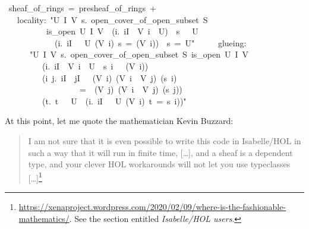 \documentclass[12pt]{scrartcl}
\begin{document}
\begin{isabelle}
\ sheaf\_of\_rings\ =\ presheaf\_of\_rings\ +\isanewline
\ \ \ locality:\ "\isasymAnd U\ I\ V\ s.\ open\_cover\_of\_open\_subset\ S\ \isanewline
\ \ \ \ \ \ \ \ \ \ is\_open\ U\ I\ V\ \isasymLongrightarrow \ (\isasymAnd i.\ i\isasymin I\ \isasymLongrightarrow \ V\ i\ \isasymsubseteq \ U)\ \isasymLongrightarrow \ s\ \isasymin \ \isasymFF \ U\isanewline
\ \ \ \ \ \ \ \ \ \ \ \isasymLongrightarrow \ (\isasymAnd i.\ i\isasymin I\ \isasymLongrightarrow \ \isasymrho \ U\ (V\ i)\ s\ =\ \isasymzero \isactrlbsub (V\ i)\isactrlesub )\ \isasymLongrightarrow \ s\ =\ \isasymzero \isactrlbsub U\isactrlesub "\isanewline
\ \ \ \ \ glueing:\ \ \isanewline
\ \ \ \ \ \ "\isasymAnd U\ I\ V\ s.\ open\_cover\_of\_open\_subset\ S\ is\_open\ U\ I\ V\ \isanewline
\ \ \ \ \ \ \ \ \isasymLongrightarrow \ (\isasymforall i.\ i\isasymin I\ \isasymlongrightarrow \ V\ i\ \isasymsubseteq \ U\ \isasymand \ s\ i\ \isasymin \ \isasymFF \ (V\ i))\ \isanewline
\ \ \ \ \ \ \ \ \isasymLongrightarrow \ (\isasymAnd i\ j.\ i\isasymin I\ \isasymLongrightarrow \ j\isasymin I\ \isasymLongrightarrow \ \isasymrho \ (V\ i)\ (V\ i\ \isasyminter \ V\ j)\ (s\ i)\isanewline
\ \ \ \ \ \ \ \ \ \ \ \ \ \ \ \ \ \ =\ \isasymrho \ (V\ j)\ (V\ i\ \isasyminter \ V\ j)\ (s\ j))\ \isanewline
\ \ \ \ \ \ \ \ \isasymLongrightarrow \ (\isasymexists t.\ t\ \isasymin \ \isasymFF \ U\ \isasymand \ (\isasymforall i.\ i\isasymin I\ \isasymlongrightarrow \ \isasymrho \ U\ (V\ i)\ t\ =\ s\ i))"
\end{isabelle}
 
At this point, let me quote the mathematician Kevin Buzzard:
\begin{quote}
	I am not sure that it is even possible to write this code in Isabelle/HOL in such a way that it will run in finite time, [\dots], and a sheaf is a dependent type, and your clever HOL workarounds will not let you use typeclasses [\dots]\footnote{\url{https://xenaproject.wordpress.com/2020/02/09/where-is-the-fashionable-mathematics/}. See the section entitled \textit{Isabelle/HOL users}.}
\end{quote}
\end{document}
